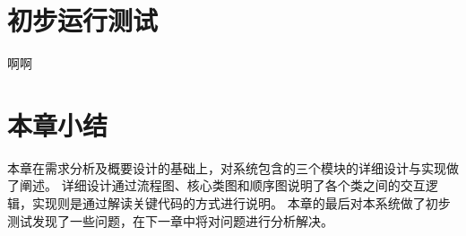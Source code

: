 \section{初步运行测试}
啊啊
\section{本章小结}
本章在需求分析及概要设计的基础上，对系统包含的三个模块的详细设计与实现做了阐述。
详细设计通过流程图、核心类图和顺序图说明了各个类之间的交互逻辑，实现则是通过解读关键代码的方式进行说明。
本章的最后对本系统做了初步测试发现了一些问题，在下一章中将对问题进行分析解决。